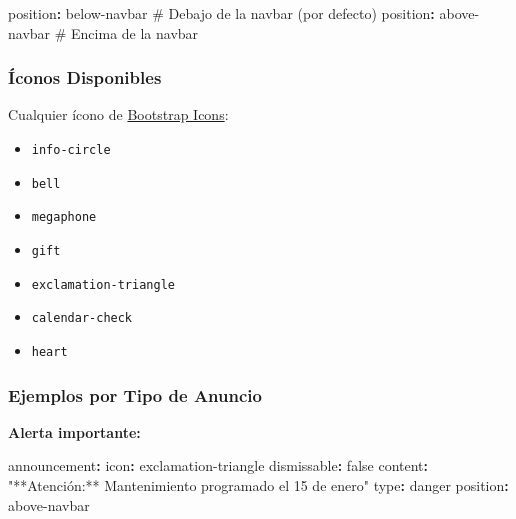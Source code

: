 \documentclass[
  doc,
  floatsintext,
  longtable,
  a4paper,
  nolmodern,
  notxfonts,
  notimes,
  12pt,
  colorlinks=true,linkcolor=blue,citecolor=blue,urlcolor=blue]{apa7}
\newenvironment{Shaded}{\begin{snugshade}}{\end{snugshade}}
\newcommand{\AttributeTok}[1]{\textcolor[rgb]{0.40,0.45,0.13}{#1}}
\newcommand{\CharTok}[1]{\textcolor[rgb]{0.13,0.47,0.30}{#1}}
\newcommand{\CommentTok}[1]{\textcolor[rgb]{0.37,0.37,0.37}{#1}}
\newcommand{\FunctionTok}[1]{\textcolor[rgb]{0.28,0.35,0.67}{#1}}
\newcommand{\KeywordTok}[1]{\textcolor[rgb]{0.00,0.23,0.31}{\textbf{#1}}}
\newcommand{\StringTok}[1]{\textcolor[rgb]{0.13,0.47,0.30}{#1}}
\providecommand{\tightlist}{%
  \setlength{\itemsep}{0pt}\setlength{\parskip}{0pt}}
\begin{document}
\begin{Shaded}
\begin{Highlighting}[]
\FunctionTok{position}\KeywordTok{:}\AttributeTok{ below{-}navbar}\CommentTok{    \# Debajo de la navbar (por defecto)}
\FunctionTok{position}\KeywordTok{:}\AttributeTok{ above{-}navbar}\CommentTok{    \# Encima de la navbar}
\end{Highlighting}
\end{Shaded}

\subsubsection{Íconos Disponibles}\label{uxedconos-disponibles}

Cualquier ícono de \href{https://icons.getbootstrap.com/}{Bootstrap
Icons}:

\begin{itemize}
\tightlist
\item
  \texttt{info-circle}
\item
  \texttt{bell}
\item
  \texttt{megaphone}
\item
  \texttt{gift}
\item
  \texttt{exclamation-triangle}
\item
  \texttt{calendar-check}
\item
  \texttt{heart}
\end{itemize}

\subsubsection{Ejemplos por Tipo de
Anuncio}\label{ejemplos-por-tipo-de-anuncio}

\textbf{Alerta importante:}

\begin{Shaded}
\begin{Highlighting}[]
\FunctionTok{announcement}\KeywordTok{:}
\AttributeTok{  }\FunctionTok{icon}\KeywordTok{:}\AttributeTok{ exclamation{-}triangle}
\AttributeTok{  }\FunctionTok{dismissable}\KeywordTok{:}\AttributeTok{ }\CharTok{false}
\AttributeTok{  }\FunctionTok{content}\KeywordTok{:}\AttributeTok{ }\StringTok{"**Atención:** Mantenimiento programado el 15 de enero"}
\AttributeTok{  }\FunctionTok{type}\KeywordTok{:}\AttributeTok{ danger}
\AttributeTok{  }\FunctionTok{position}\KeywordTok{:}\AttributeTok{ above{-}navbar}
\end{Highlighting}
\end{Shaded}
\end{document}
